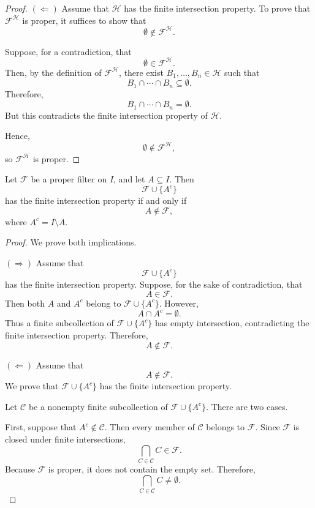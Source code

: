 {\begin{proof}
\noindent\((\Leftarrow)\)
Assume that \(\mathcal{H}\) has the finite intersection property. To prove
that \(\mathcal{F}^{\mathcal{H}}\) is proper, it suffices to show that
\[
\emptyset \notin \mathcal{F}^{\mathcal{H}}.
\]

Suppose, for a contradiction, that
\[
\emptyset \in \mathcal{F}^{\mathcal{H}}.
\]
Then, by the definition of \(\mathcal{F}^{\mathcal{H}}\), there exist
\(B_1,\ldots,B_n \in \mathcal{H}\) such that
\[
B_1 \cap \cdots \cap B_n \subseteq \emptyset.
\]
Therefore,
\[
B_1 \cap \cdots \cap B_n = \emptyset.
\]
But this contradicts the finite intersection property of \(\mathcal{H}\).

Hence,
\[
\emptyset \notin \mathcal{F}^{\mathcal{H}},
\]
so \(\mathcal{F}^{\mathcal{H}}\) is proper.
\end{proof}

\begin{prop} \label{prop:adjoining a complement to a proper filter}
Let \(\mathcal{F}\) be a proper filter on \(I\), and let \(A\subseteq I\).
Then
\[
\mathcal{F}\cup\{A^c\}
\]
has the finite intersection property if and only if
\[
A\notin\mathcal{F},
\]
where \(A^c=I\setminus A\).
\end{prop}

\begin{proof}
We prove both implications.

\noindent\((\Rightarrow)\)
Assume that
\[
\mathcal{F}\cup\{A^c\}
\]
has the finite intersection property. Suppose, for the sake of contradiction,
that
\[
A\in\mathcal{F}.
\]
Then both \(A\) and \(A^c\) belong to
\(\mathcal{F}\cup\{A^c\}\). However,
\[
A\cap A^c=\emptyset.
\]
Thus a finite subcollection of
\(\mathcal{F}\cup\{A^c\}\) has empty intersection, contradicting the finite
intersection property. Therefore,
\[
A\notin\mathcal{F}.
\]

\noindent\((\Leftarrow)\)
Assume that
\[
A\notin\mathcal{F}.
\]
We prove that \(\mathcal{F}\cup\{A^c\}\) has the finite intersection
property.

Let \(\mathcal{C}\) be a nonempty finite subcollection of
\(\mathcal{F}\cup\{A^c\}\). There are two cases.

First, suppose that \(A^c\notin\mathcal{C}\). Then every member of
\(\mathcal{C}\) belongs to \(\mathcal{F}\). Since \(\mathcal{F}\) is closed
under finite intersections,
\[
\bigcap_{C\in\mathcal{C}} C\in\mathcal{F}.
\]
Because \(\mathcal{F}\) is proper, it does not contain the empty set.
Therefore,
\[
\bigcap_{C\in\mathcal{C}} C\neq\emptyset.
\]


\end{proof}}
